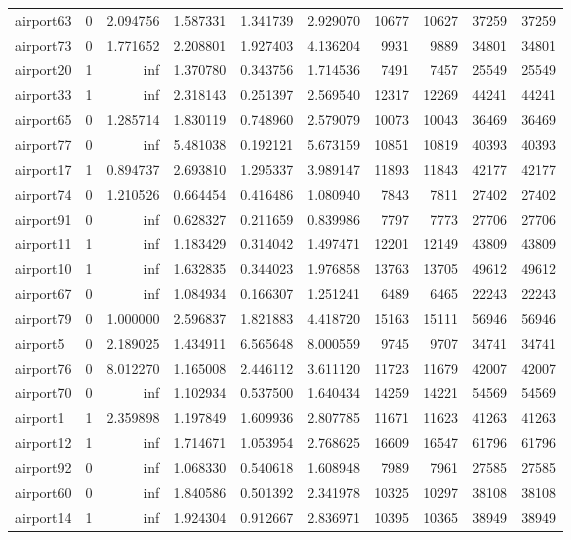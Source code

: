 \begin{longtable}{|l|r|r|r|r|r|r|r|r|r|}
airport63 & 0 & 2.094756 & 1.587331 & 1.341739 & 2.929070 & 10677 & 10627 & 37259 & 37259 \\
airport73 & 0 & 1.771652 & 2.208801 & 1.927403 & 4.136204 & 9931 & 9889 & 34801 & 34801 \\
airport20 & 1 & inf & 1.370780 & 0.343756 & 1.714536 & 7491 & 7457 & 25549 & 25549 \\
airport33 & 1 & inf & 2.318143 & 0.251397 & 2.569540 & 12317 & 12269 & 44241 & 44241 \\
airport65 & 0 & 1.285714 & 1.830119 & 0.748960 & 2.579079 & 10073 & 10043 & 36469 & 36469 \\
airport77 & 0 & inf & 5.481038 & 0.192121 & 5.673159 & 10851 & 10819 & 40393 & 40393 \\
airport17 & 1 & 0.894737 & 2.693810 & 1.295337 & 3.989147 & 11893 & 11843 & 42177 & 42177 \\
airport74 & 0 & 1.210526 & 0.664454 & 0.416486 & 1.080940 & 7843 & 7811 & 27402 & 27402 \\
airport91 & 0 & inf & 0.628327 & 0.211659 & 0.839986 & 7797 & 7773 & 27706 & 27706 \\
airport11 & 1 & inf & 1.183429 & 0.314042 & 1.497471 & 12201 & 12149 & 43809 & 43809 \\
airport10 & 1 & inf & 1.632835 & 0.344023 & 1.976858 & 13763 & 13705 & 49612 & 49612 \\
airport67 & 0 & inf & 1.084934 & 0.166307 & 1.251241 & 6489 & 6465 & 22243 & 22243 \\
airport79 & 0 & 1.000000 & 2.596837 & 1.821883 & 4.418720 & 15163 & 15111 & 56946 & 56946 \\
airport5 & 0 & 2.189025 & 1.434911 & 6.565648 & 8.000559 & 9745 & 9707 & 34741 & 34741 \\
airport76 & 0 & 8.012270 & 1.165008 & 2.446112 & 3.611120 & 11723 & 11679 & 42007 & 42007 \\
airport70 & 0 & inf & 1.102934 & 0.537500 & 1.640434 & 14259 & 14221 & 54569 & 54569 \\
airport1 & 1 & 2.359898 & 1.197849 & 1.609936 & 2.807785 & 11671 & 11623 & 41263 & 41263 \\
airport12 & 1 & inf & 1.714671 & 1.053954 & 2.768625 & 16609 & 16547 & 61796 & 61796 \\
airport92 & 0 & inf & 1.068330 & 0.540618 & 1.608948 & 7989 & 7961 & 27585 & 27585 \\
airport60 & 0 & inf & 1.840586 & 0.501392 & 2.341978 & 10325 & 10297 & 38108 & 38108 \\
airport14 & 1 & inf & 1.924304 & 0.912667 & 2.836971 & 10395 & 10365 & 38949 & 38949 \\

\end{longtable}
